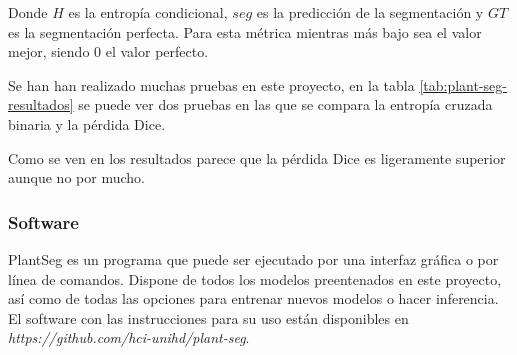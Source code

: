 Donde $H$ es la entropía condicional, $seg$ es la predicción de la segmentación y $GT$ es la segmentación perfecta. Para esta métrica mientras más bajo sea el valor mejor, siendo 0 el valor perfecto.

Se han han realizado muchas pruebas en este proyecto, en la tabla \ref{tab:plant-seg-resultados} se puede ver dos pruebas en las que se compara la entropía cruzada binaria y la pérdida Dice.


Como se ven en los resultados parece que la pérdida Dice es ligeramente superior aunque no por mucho.

\subsubsection{Software}

PlantSeg es un programa que puede ser ejecutado por una interfaz gráfica o por línea de comandos. Dispone de todos los modelos preentenados en este proyecto, así como de todas las opciones para entrenar nuevos modelos o hacer inferencia. El software con las instrucciones para su uso están disponibles en \textit{https://github.com/hci-unihd/plant-seg}.

